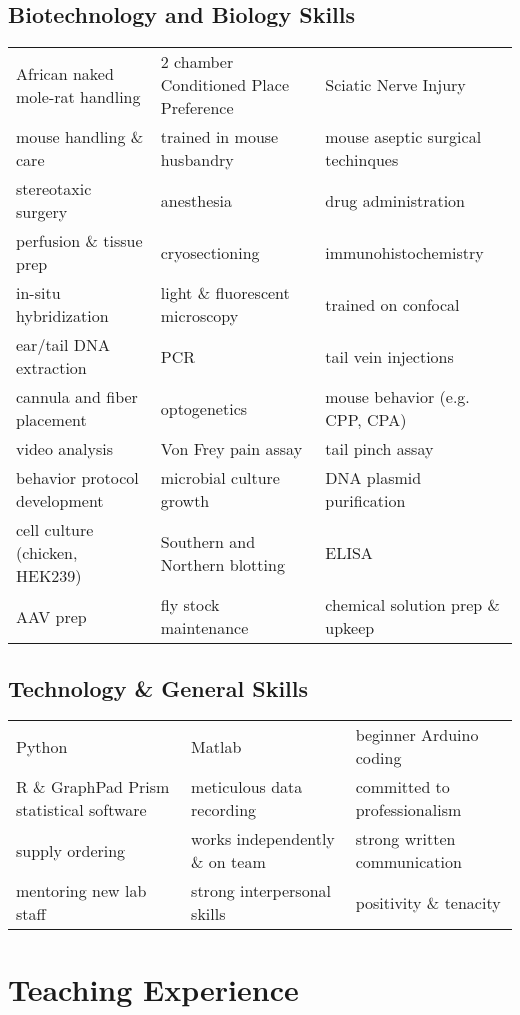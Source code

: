 \documentclass[letterpaper]{article}
\begin{document}
\subsection*{Biotechnology and Biology Skills}
\begin{tabular}{lll}
African naked mole-rat handling & 2 chamber Conditioned Place Preference & Sciatic Nerve Injury \\
mouse handling \& care	& trained in mouse husbandry		& mouse aseptic surgical techinques \\
stereotaxic surgery 		& anesthesia 				& drug administration \\
perfusion \& tissue prep 	& cryosectioning 			& immunohistochemistry \\
in-situ hybridization		& light \& fluorescent microscopy	& trained on confocal \\
ear/tail DNA extraction 	& PCR	 				& tail vein injections \\
cannula and fiber placement 	& optogenetics 				& mouse behavior (e.g. CPP, CPA) \\
video analysis			& Von Frey pain assay	 		& tail pinch assay \\
behavior protocol development 	& microbial culture growth 		& DNA plasmid purification \\
cell culture (chicken, HEK239)	& Southern and Northern blotting	& ELISA \\
AAV prep			& fly stock maintenance 		& chemical solution prep \& upkeep \\
\end{tabular}

\subsection*{Technology \& General Skills}
\begin{tabular}{lll}
Python				& Matlab				& beginner Arduino coding \\
R \& GraphPad Prism statistical software& meticulous data recording		& committed to professionalism \\
supply ordering			& works independently \& on team	& strong written communication \\
mentoring new lab staff		& strong interpersonal skills 		& positivity \& tenacity \\
\end{tabular}

\section*{Teaching Experience}
\end{document}

